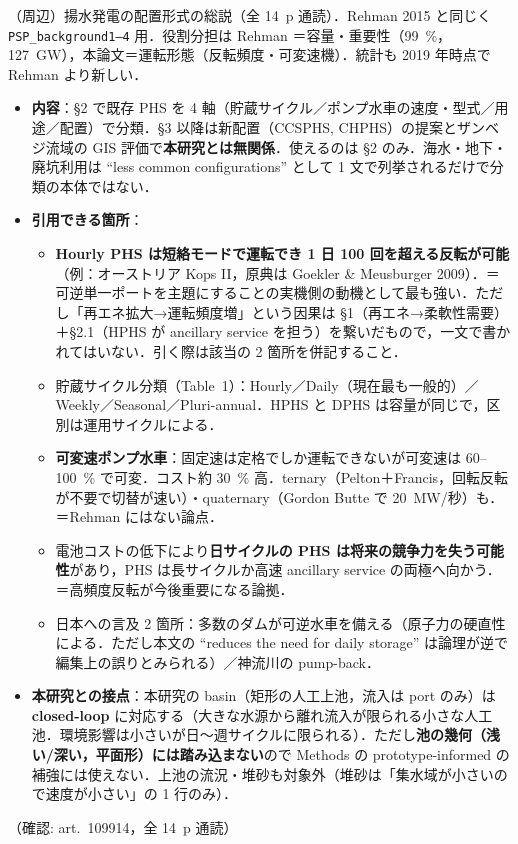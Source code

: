 \documentclass[11pt]{jsarticle}
\newcommand{\litref}[1]{{\large\bfseries\color{citecolor}#1}}
\begin{document}
\noindent\litref{Hunt et al. (2020)}\quad（周辺）揚水発電の配置形式の総説（全 14~p 通読）．Rehman 2015 と同じく \texttt{PSP\_background1--4} 用．役割分担は Rehman ＝容量・重要性（99~\%，127~GW），本論文＝運転形態（反転頻度・可変速機）．統計も 2019 年時点で Rehman より新しい．
\begin{itemize}
  \item \textbf{内容}：§2 で既存 PHS を 4 軸（貯蔵サイクル／ポンプ水車の速度・型式／用途／配置）で分類．§3 以降は新配置（CCSPHS, CHPHS）の提案とザンベジ流域の GIS 評価で\textbf{本研究とは無関係}．使えるのは §2 のみ．海水・地下・廃坑利用は ``less common configurations'' として 1 文で列挙されるだけで分類の本体ではない．
  \item \textbf{引用できる箇所}：
  \begin{itemize}
    \item \textbf{Hourly PHS は短絡モードで運転でき 1 日 100 回を超える反転が可能}（例：オーストリア Kops II，原典は Goekler \& Meusburger 2009）．＝可逆単一ポートを主題にすることの実機側の動機として最も強い．ただし「再エネ拡大→運転頻度増」という因果は §1（再エネ→柔軟性需要）＋§2.1（HPHS が ancillary service を担う）を繋いだもので，一文で書かれてはいない．引く際は該当の 2 箇所を併記すること．
    \item 貯蔵サイクル分類（Table~1）：Hourly／Daily（現在最も一般的）／Weekly／Seasonal／Pluri-annual．HPHS と DPHS は容量が同じで，区別は運用サイクルによる．
    \item \textbf{可変速ポンプ水車}：固定速は定格でしか運転できないが可変速は 60--100~\% で可変．コスト約 30~\% 高．ternary（Pelton＋Francis，回転反転が不要で切替が速い）・quaternary（Gordon Butte で 20~MW/秒）も．＝Rehman にはない論点．
    \item 電池コストの低下により\textbf{日サイクルの PHS は将来の競争力を失う可能性}があり，PHS は長サイクルか高速 ancillary service の両極へ向かう．＝高頻度反転が今後重要になる論拠．
    \item 日本への言及 2 箇所：多数のダムが可逆水車を備える（原子力の硬直性による．ただし本文の ``reduces the need for daily storage'' は論理が逆で編集上の誤りとみられる）／神流川の pump-back．
  \end{itemize}
  \item \textbf{本研究との接点}：本研究の basin（矩形の人工上池，流入は port のみ）は\textbf{closed-loop} に対応する（大きな水源から離れ流入が限られる小さな人工池．環境影響は小さいが日〜週サイクルに限られる）．ただし\textbf{池の幾何（浅い/深い，平面形）には踏み込まない}ので Methods の prototype-informed の補強には使えない．上池の流況・堆砂も対象外（堆砂は「集水域が小さいので速度が小さい」の 1 行のみ）．
\end{itemize}
\noindent（確認: art.\ 109914，全 14~p 通読）
\end{document}
